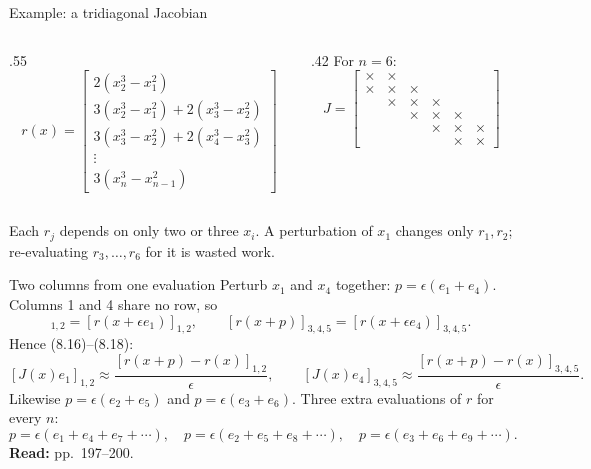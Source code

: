 \documentclass[12pt,aspectratio=169]{beamer}
\newcommand{\readpp}[1]{{\color{red!80!black}\textbf{Read:} #1}}
\newcommand{\eps}{\epsilon}
\begin{document}
\begin{frame}{Example: a tridiagonal Jacobian}
  \begin{columns}[c]
    \begin{column}{.55\textwidth}
      \begin{equation}
        r(x) = \begin{bmatrix}
          2(x_2^3-x_1^2)\\
          3(x_2^3-x_1^2)+2(x_3^3-x_2^2)\\
          3(x_3^3-x_2^2)+2(x_4^3-x_3^2)\\
          \vdots\\
          3(x_n^3-x_{n-1}^2)
        \end{bmatrix} \tag{8.13}
      \end{equation}
    \end{column}
    \begin{column}{.42\textwidth}
      For $n=6$:
      \begin{equation}
        J = \begin{bmatrix}
          \times&\times&&&&\\
          \times&\times&\times&&&\\
          &\times&\times&\times&&\\
          &&\times&\times&\times&\\
          &&&\times&\times&\times\\
          &&&&\times&\times
        \end{bmatrix} \tag{8.14}
      \end{equation}
    \end{column}
  \end{columns}
  \vspace{1ex}
  Each $r_j$ depends on only two or three $x_i$. A perturbation of $x_1$ changes only $r_1, r_2$;
  re-evaluating $r_3,\dots,r_6$ for it is wasted work.
\end{frame}

\begin{frame}{Two columns from one evaluation}
  Perturb $x_1$ and $x_4$ together: $p=\eps(e_1+e_4)$. Columns 1 and 4 share no row, so
  \begin{equation}
    [r(x+p)]_{1,2} = [r(x+\eps e_1)]_{1,2}, \qquad
    [r(x+p)]_{3,4,5} = [r(x+\eps e_4)]_{3,4,5}. \tag{8.15}
  \end{equation}
  Hence (8.16)--(8.18):
  \[
    [J(x)e_1]_{1,2}\approx\frac{[r(x+p)-r(x)]_{1,2}}{\eps}, \qquad
    [J(x)e_4]_{3,4,5}\approx\frac{[r(x+p)-r(x)]_{3,4,5}}{\eps}.
  \]
  Likewise $p=\eps(e_2+e_5)$ and $p=\eps(e_3+e_6)$.
  \alert{Three extra evaluations of $r$ for every $n$}:
  \[
    p=\eps(e_1+e_4+e_7+\cdots),\quad p=\eps(e_2+e_5+e_8+\cdots),\quad p=\eps(e_3+e_6+e_9+\cdots).
  \]
  \readpp{pp.~197--200.}
\end{frame}
\end{document}
